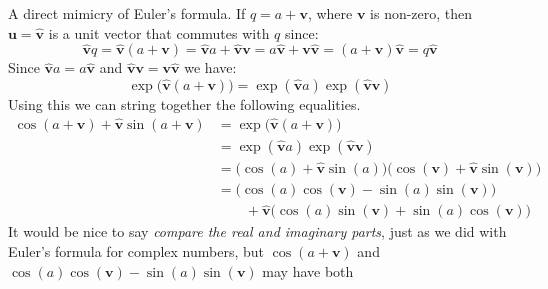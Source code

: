 \documentclass{article}
\begin{document}
            A direct mimicry of Euler's formula. If
            $q=a+\mathbf{v}$, where $\mathbf{v}$ is non-zero,
            then $\mathbf{u}=\hat{\mathbf{v}}$ is a unit vector that commutes
            with $q$ since:
            \begin{equation}
                \hat{\mathbf{v}}q
                =\hat{\mathbf{v}}(a+\mathbf{v})
                =\hat{\mathbf{v}}a+\hat{\mathbf{v}}\mathbf{v}
                =a\hat{\mathbf{v}}+\mathbf{v}\hat{\mathbf{v}}
                =(a+\mathbf{v})\hat{\mathbf{v}}
                =q\hat{\mathbf{v}}
            \end{equation}
            Since $\hat{\mathbf{v}}a=a\hat{\mathbf{v}}$ and
            $\hat{\mathbf{v}}\mathbf{v}=\mathbf{v}\hat{\mathbf{v}}$
            we have:
            \begin{equation}
                \exp\big(\hat{\mathbf{v}}(a+\mathbf{v})\big)=
                \exp(\hat{\mathbf{v}}a)\exp(\hat{\mathbf{v}}\mathbf{v})
            \end{equation}
            Using this we can string together the following equalities.
            \begin{subequations}
                \begin{align}
                    \cos(a+\mathbf{v})+\hat{\mathbf{v}}\sin(a+\mathbf{v})
                    &=\exp\big(\hat{\mathbf{v}}(a+\mathbf{v})\big)\\
                    &=\exp(\hat{\mathbf{v}}a)\exp(\hat{\mathbf{v}}\mathbf{v})\\
                    &=\Big(\cos(a)+\hat{\mathbf{v}}\sin(a)\Big)\Big(
                            \cos(\mathbf{v})+\hat{\mathbf{v}}\sin(\mathbf{v})
                        \Big)\\
                    &=\Big(\cos(a)\cos(\mathbf{v})-\sin(a)\sin(\mathbf{v})\Big)
                        \nonumber\\
                        &\hspace{2em}
                        +\hat{\mathbf{v}}\Big(
                            \cos(a)\sin(\mathbf{v})+\sin(a)\cos(\mathbf{v})
                        \Big)
                \end{align}
            \end{subequations}
            It would be nice to say
            \textit{compare the real and imaginary parts}, just as we did with
            Euler's formula for complex numbers, but
            $\cos(a+\mathbf{v})$ and
            $\cos(a)\cos(\mathbf{v})-\sin(a)\sin(\mathbf{v})$ may have both
\end{document}
